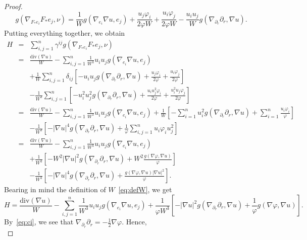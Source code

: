 \documentclass[10pt,a4paper]{amsart}
\begin{document}
\begin{proof}
\begin{equation}
    g \left( \nabla_{F_* e_i} F_* e_j , \nu \right)=\frac{1}{W}g\left(\nabla_{e_i}\nabla u,e_j\right)+\frac{u_j\varphi_i}{2\varphi W}+\frac{u_i\varphi_j}{2\varphi W}-\frac{u_iu_j}{W}g\left(\nabla_{\partial_r} \partial_r,\nabla u\right).
\end{equation}
Putting everything together, we obtain
\begin{eqnarray*}
H&=& \sum_{i,j=1}^{n} \gamma^{ij} g \left( \nabla_{F_* e_i} F_* e_j , \nu \right)\\
&=&\frac{\mathrm{div}(\nabla u)}{W} -\sum^{n}_{i,j=1}\frac{1}{W^3}u_iu_jg\left(\nabla_{e_i}\nabla u,e_j\right)\\
&&+\frac{1}{W}\sum^{n}_{i,j=1}\delta_{ij}\left[-u_iu_jg\left(\nabla_{\partial_r} \partial_r,\nabla u\right)+\frac{u_j\varphi_i}{2\varphi}+\frac{u_i\varphi_j}{2\varphi}\right]\\
&&-\frac{1}{W^3}\sum^{n}_{i,j=1}\left[-u_i^2u_j^2g\left(\nabla_{\partial_r} \partial_r,\nabla u\right)+\frac{u_iu_j^2\varphi_i}{2\varphi}+\frac{u_i^2u_j\varphi_j}{2\varphi}\right]\\
&=&\frac{\mathrm{div}(\nabla u)}{W}
-\sum^{n}_{i,j=1}\frac{1}{W^3}u_iu_jg\left(\nabla_{e_i}\nabla u,e_j\right) +\frac{1}{W}\left[-\sum^{n}_{i=1}u_i^2g\left(\nabla_{\partial_r} \partial_r,\nabla u\right)+\sum^{n}_{i=1}\frac{u_i\varphi_i}{\varphi}\right]\\
&&-\frac{1}{W^3}\left[-|\nabla u|^4
g\left(\nabla_{\partial_r} \partial_r,\nabla u\right)+\frac{1}{\varphi}\sum^{n}_{i,j=1}u_i\varphi_iu_j^2\right]\\
&=&\frac{\mathrm{div}(\nabla u)}{W} -\sum^{n}_{i,j=1}\frac{1}{W^3}u_iu_jg\left(\nabla_{e_i}\nabla u,e_j\right)\\
&&+\frac{1}{W^3}\left[-W^2|\nabla u|^2g\left(\nabla_{\partial_r} \partial_r,\nabla u\right)+W^2\frac{g(\nabla \varphi,\nabla u)}{\varphi}\right]\\
&&-\frac{1}{W^3}\left[-|\nabla u|^4g\left(\nabla_{\partial_r} \partial_r,\nabla u\right)+\frac{g(\nabla \varphi,\nabla u)|\nabla u|^2}{\varphi}\right].
\end{eqnarray*}
Bearing in mind the definition of $W$~\eqref{eq:defW}, we get
\[ H = \frac{\mathrm{div}(\nabla u)}{W}-\sum^{n}_{i,j=1}\frac{1}{W^3}u_iu_jg(\nabla_{e_i}\nabla u,e_j)+\frac{1}{\varphi W^3}\left[-|\nabla u|^2g\left(\nabla_{\partial_r} \partial_r,\nabla u\right)+\frac{1}{\varphi}g(\nabla \varphi,\nabla u)\right].
\]
By~\eqref{eq:ci}, we see that $\nabla_{\partial_r} \partial_r=-\frac{1}{2}\nabla \varphi$. Hence,
\begin{equation} \label{eq:nH}

\end{equation}
\end{proof}
\end{document}
